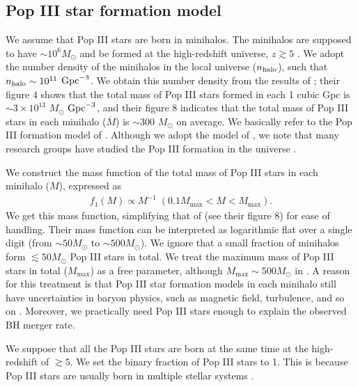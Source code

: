 \documentclass[pdftex]{pasj01}
\newcommand{\msun}{M_\odot}
\newcommand{\cgpc}{{\rm Gpc}^{-3}}
\newcommand{\nhalo}{n_{\rm halo}}
\newcommand{\mlave}{\overline{M}}
\newcommand{\mlmax}{M_{\max}}
\begin{document}
\subsection{Pop III star formation model}
\label{sec:PopIIIStarFormationModel}

We assume that Pop III stars are born in minihalos. The minihalos are
supposed to have $\sim 10^6 \msun$ and be formed at the high-redshift
universe, $z \gtrsim 5$ \citep{2016MNRAS.460L..74H,
  2020MNRAS.492.4386S, 2020ApJ...897...95V}. We adopt the number
density of the minihalos in the local universe ($\nhalo$), such that
$\nhalo \sim 10^{11}$ $\cgpc$. We obtain this number density from the
results of \citet{2020MNRAS.492.4386S}; their figure 4 shows that the
total mass of Pop III stars formed in each 1 cubic Gpc is $\sim 3
\times 10^{13}$ $\msun$ $\cgpc$, and their figure 8 indicates that the
total mass of Pop III stars in each minihalo ($\mlave$) is $\sim 300$
$\msun$ on average. We basically refer to the Pop III formation model
of \citet{2020MNRAS.492.4386S}. Although we adopt the model of
\citet{2020MNRAS.492.4386S}, we note that many research groups have
studied the Pop III formation in the universe
\citep{2014ApJ...792...32S, 2015MNRAS.448..568H, 2016ApJ...826....9I,
  2016MNRAS.461.2722I, 2016MNRAS.462.3591M, 2020ApJ...897...95V}.

We construct the mass function of the total mass of Pop III stars in
each minihalo ($M$), expressed as
\begin{eqnarray}
f_1(M) \propto M^{-1} \; (0.1 \mlmax < M < \mlmax).
\end{eqnarray}
We get this mass function, simplifying that of
\citet{2020MNRAS.492.4386S} (see their figure 8) for ease of
handling. Their mass function can be interpreted as logarithmic flat
over a single digit (from $\sim 50 \msun$ to $\sim 500 \msun$). We
ignore that a small fraction of minihalos form $\lesssim 50 \msun$ Pop
III stars in total. We treat the maximum mass of Pop III stars in
total ($\mlmax$) as a free parameter, although $\mlmax \sim 500 \msun$
in \citet{2020MNRAS.492.4386S}. A reason for this treatment is that
Pop III star formation models in each minihalo still have
uncertainties in baryon physics, such as magnetic field, turbulence,
and so on \citep{2011ApJ...731...62F, 2012ApJ...745..154T,
  2021MNRAS.505.4197S, 2021ApJ...915..107H}.  Moreover, we practically
need Pop III stars enough to explain the observed BH merger rate.

We suppose that all the Pop III stars are born at the same time at the
high-redshift of $\gtrsim 5$. We set the binary fraction of Pop III
stars to 1. This is because Pop III stars are usually born in multiple
stellar systems \citep{2009Sci...325..601T, 2011Sci...331.1040C,
  2011ApJ...737...75G, 2014ApJ...792...32S, 2020ApJ...892L..14S}.
\end{document}
